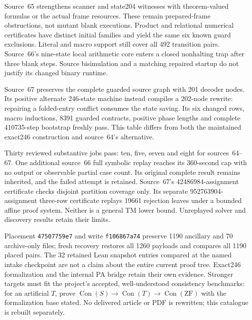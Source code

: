 \documentclass[11pt]{article}
\begin{document}
{Source~65 strengthens scanner and state204 witnesses with theorem-valued
formulas or the actual frame resources. These remain prepared-frame
obstructions, not mutant blank executions. Product and relational numerical
certificates have distinct initial families and yield the same six known guard
exclusions. Literal and macro support still cover all 492 transition pairs.
Source~66's nine-state local arithmetic core enters a closed nonhalting trap
after three blank steps. Source bisimulation and a matching repaired startup
do not justify its changed binary runtime.

Source~67 preserves the complete guarded source graph with 201 decoder nodes.
Its positive alternate 246-state machine instead compiles a 202-node rewrite:
repairing a folded-entry conflict consumes the state saving. Its six changed
rows, macro inductions, 8391 guarded contracts, positive phase lengths and
complete 410735-step bootstrap freshly pass. This table differs from both the
maintained exact246 construction and source~64's alternative.

Thirty reviewed substantive jobs pass: ten, five, seven and eight for
sources~64--67. One additional source~66 full symbolic replay reaches its
360-second cap with no output or observable partial case count. Its original
complete result remains inherited, and the failed attempt is retained.
Source~67's 42486984-assignment certificate checks disjoint partition coverage
only. Its separate 952763904-assignment three-row certificate replays 19661
rejection leaves under a bounded affine proof system. Neither is a general
TM lower bound. Unreplayed solver and discovery results retain their limits.

Placement \texttt{47507759e7} and write \texttt{f106867a74} preserve 1190
ancillary and 70 archive-only files; fresh recovery restores all 1260 payloads
and compares all 1190 placed pairs. The 32 retained Lean snapshot entries
compared at the named intake checkpoint are not a claim about the entire
current proof tree. Exact246 formalization and the internal PA bridge retain
their own evidence. Stronger targets must fit the project's accepted,
well-understood consistency benchmarks: for an artificial $T$, prove
$\operatorname{Con}(S)\to\operatorname{Con}(T)\to\operatorname{Con}(\mathrm{ZF})$ with the formalization base stated.
No delivered article or PDF is rewritten; this catalogue is rebuilt separately.

}
\end{document}
